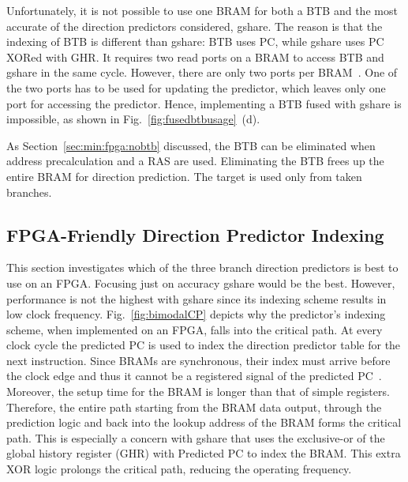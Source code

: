 Unfortunately, it is not possible to use one BRAM for both a BTB and the most accurate of the direction predictors considered, gshare. The reason is that the indexing of BTB is different than gshare: BTB uses PC, while gshare uses PC XORed with GHR. It requires two read ports on a BRAM to access BTB and gshare in the same cycle. However, there are only two ports per BRAM~\cite{StratixIVM9K}. One of the two ports has to be used for updating the predictor, which leaves only one port for accessing the predictor. Hence, implementing a BTB fused with gshare is impossible, as shown in Fig.~\ref{fig:fusedbtbusage}~(d).


As Section~\ref{sec:min:fpga:nobtb} discussed, the BTB can be eliminated when address precalculation and a RAS are used. Eliminating the BTB frees up the entire BRAM for direction prediction. The target is used only from taken branches. 


\subsection{FPGA-Friendly Direction Predictor Indexing}
\label{sec:min:fpga:indexing}
This section investigates which of the three branch direction predictors is best to use on an FPGA. Focusing just on accuracy gshare would be the best. However, performance is not the highest with gshare since its indexing scheme results in low clock frequency. Fig.~\ref{fig:bimodalCP} depicts why the predictor's indexing scheme, when implemented on an FPGA, falls into the critical path. At every clock cycle the predicted PC is used to index the direction predictor table for the next instruction. Since BRAMs are synchronous, their index must arrive before the clock edge and thus it cannot be a registered signal of the predicted PC~\cite{StratixIVM9K}. Moreover, the setup time for the BRAM is longer than that of simple registers. Therefore, the entire path starting from the BRAM data output, through the prediction logic and back into the lookup address of the BRAM forms the critical path. This is especially a concern with gshare that uses the exclusive-or of the global history register (GHR) with Predicted PC to index the BRAM. This extra XOR logic prolongs the critical path, reducing the operating frequency.

